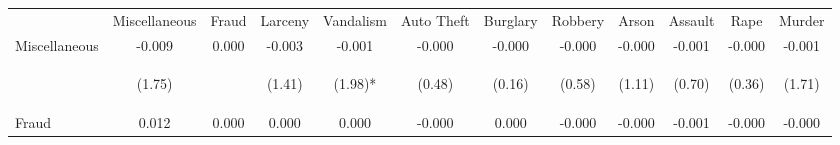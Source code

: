 \begin{tabular}{lccccccccccc}
\hline\hline \noalign{\smallskip} & Miscellaneous & Fraud & Larceny & Vandalism & Auto Theft & Burglary & Robbery & Arson & Assault & Rape & Murder\\
\noalign{\smallskip}\hline \noalign{\smallskip}Miscellaneous & -0.009 & 0.000 & -0.003 & -0.001 & -0.000 & -0.000 & -0.000 & -0.000 & -0.001 & -0.000 & -0.001\\
 & \begin{footnotesize}(1.75)\end{footnotesize} & \begin{footnotesize}\end{footnotesize} & \begin{footnotesize}(1.41)\end{footnotesize} & \begin{footnotesize}(1.98)*\end{footnotesize} & \begin{footnotesize}(0.48)\end{footnotesize} & \begin{footnotesize}(0.16)\end{footnotesize} & \begin{footnotesize}(0.58)\end{footnotesize} & \begin{footnotesize}(1.11)\end{footnotesize} & \begin{footnotesize}(0.70)\end{footnotesize} & \begin{footnotesize}(0.36)\end{footnotesize} & \begin{footnotesize}(1.71)\end{footnotesize}\\
\noalign{\smallskip}Fraud & 0.012 & 0.000 & 0.000 & 0.000 & -0.000 & 0.000 & -0.000 & -0.000 & -0.001 & -0.000 & -0.000\\

\end{tabular}
